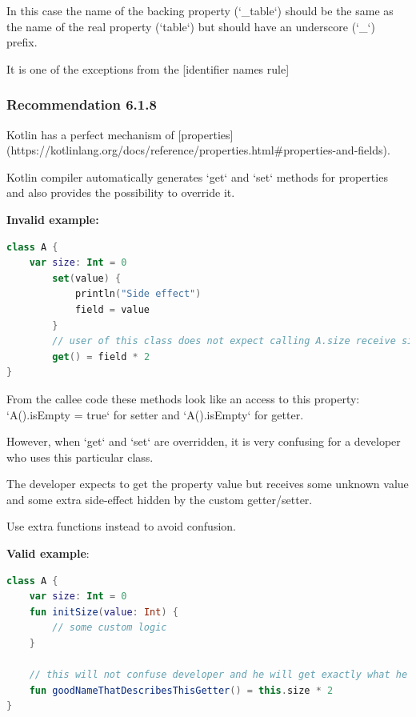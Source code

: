 {{{{In this case the name of the backing property (`_table`) should be the same as the name of the real property (`table`) but should have an underscore (`_`) prefix.

It is one of the exceptions from the [identifier names rule]



\subsubsection*{\textbf{Recommendation 6.1.8}}
\leavevmode\newline

Kotlin has a perfect mechanism of [properties](https://kotlinlang.org/docs/reference/properties.html\#properties-and-fields).

Kotlin compiler automatically generates `get` and `set` methods for properties and also provides the possibility to override it.



\textbf{Invalid example:}

\begin{lstlisting}[language=Kotlin]
class A {
    var size: Int = 0
        set(value) {
            println("Side effect")
            field = value
        }
        // user of this class does not expect calling A.size receive size * 2
        get() = field * 2
}
\end{lstlisting}


From the callee code these methods look like an access to this property: `A().isEmpty = true` for setter and `A().isEmpty` for getter.



However, when `get` and `set` are overridden, it is very confusing for a developer who uses this particular class.

The developer expects to get the property value but receives some unknown value and some extra side-effect hidden by the custom getter/setter.

Use extra functions instead to avoid confusion.







\textbf{Valid example}:

\begin{lstlisting}[language=Kotlin]
class A {
    var size: Int = 0
    fun initSize(value: Int) {
        // some custom logic
    }

    // this will not confuse developer and he will get exactly what he expects
    fun goodNameThatDescribesThisGetter() = this.size * 2
}
\end{lstlisting}


}}}}
